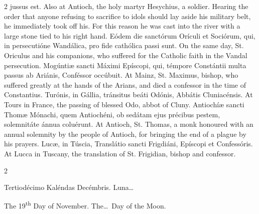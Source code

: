 \begin{paracol}{2}
 jussus est.
\switchcolumn
{}
Also at Antioch, the holy martyr 
 Hesychius, a soldier. Hearing the order that anyone refusing to 
 sacrifice to idols should lay aside his military belt, he immediately took 
 off his. For this reason he was cast into the river with a large stone 
 tied to his right hand.
\switchcolumn*
{}
Eódem die sanctórum 
 Orículi et Sociórum, qui, in persecutióne Wandálica, pro fide cathólica 
 passi sunt.
\switchcolumn
{}
On the same day, St. Oriculus and 
 his companions, who suffered for the Catholic faith in the Vandal 
 persecution.
\switchcolumn*
{}
Mogúntiæ sancti Máximi 
 Epíscopi, qui, témpore Constántii multa passus ab Ariánis, Conféssor occúbuit.
\switchcolumn
{}
At Mainz, St. Maximus, bishop, who 
 suffered greatly at the hands of the Arians, and died a confessor in the 
 time of Constantius.
\switchcolumn*
{}
Turónis, in Gállia, 
 tránsitus beáti Odónis, Abbátis Cluniacénsis.
\switchcolumn
{}
At Tours in France, the passing of 
 blessed Odo, abbot of Cluny.
\switchcolumn*
{}
Antiochíæ sancti Thomæ 
 Mónachi, quem Antiochéni, ob sedátam ejus précibus pestem, solemnitáte ánnua 
 coluérunt.
\switchcolumn
{}
At Antioch, St. Thomas, a monk 
 honoured with an annual solemnity by the people of Antioch, for bringing the 
 end of a plague by his prayers.
\switchcolumn*
{}
Lucæ, in Túscia, 
 Translátio sancti Frigdiáni, Epíscopi et Confessóris.
\switchcolumn
{}
At Lucca in Tuscany, the translation 
 of St. Frigidian, bishop and confessor.
\switchcolumn*
{}
\end{paracol}


\begin{paracol}{2}
\begin{center}{\color{gregoriocolor} Tertiodécimo Kaléndas Decémbris. 
 Luna\dots\ }\end{center}
\switchcolumn
{}
\begin{center}{\color{gregoriocolor} The 
 19\textsuperscript{th} Day of 
 November. The\dots\ Day of the Moon.}\end{center}
\end{paracol}


